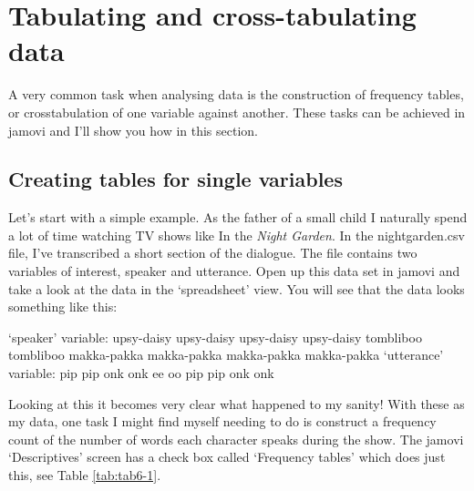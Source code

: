 \documentclass[
]{book}
\begin{document}
\hypertarget{tabulating-and-cross-tabulating-data}{%
\section{Tabulating and cross-tabulating data}\label{tabulating-and-cross-tabulating-data}}

A very common task when analysing data is the construction of frequency tables, or crosstabulation of one variable against another. These tasks can be achieved in jamovi and I'll show you how in this section.

\hypertarget{creating-tables-for-single-variables}{%
\subsection{Creating tables for single variables}\label{creating-tables-for-single-variables}}

Let's start with a simple example. As the father of a small child I naturally spend a lot of time watching TV shows like In the \emph{Night Garden}. In the nightgarden.csv file, I've transcribed a short section of the dialogue. The file contains two variables of interest, speaker and utterance. Open up this data set in jamovi and take a look at the data in the `spreadsheet' view. You will see that the data looks something like this:

`speaker' variable: upsy-daisy upsy-daisy upsy-daisy upsy-daisy tombliboo tombliboo makka-pakka makka-pakka makka-pakka makka-pakka `utterance' variable: pip pip onk onk ee oo pip pip onk onk

Looking at this it becomes very clear what happened to my sanity! With these as my data, one task I might find myself needing to do is construct a frequency count of the number of words each character speaks during the show. The jamovi `Descriptives' screen has a check box called `Frequency tables' which does just this, see Table \ref{tab:tab6-1}.

 
  \providecommand{\huxb}[2]{\arrayrulecolor[RGB]{#1}\global\arrayrulewidth=#2pt}
  \providecommand{\huxvb}[2]{\color[RGB]{#1}\vrule width #2pt}
  \providecommand{\huxtpad}[1]{\rule{0pt}{#1}}
  \providecommand{\huxbpad}[1]{\rule[-#1]{0pt}{#1}}
\end{document}
